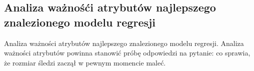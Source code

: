 \documentclass[]{article}
\begin{document}
\hypertarget{analiza-waux17cnoux15bux107i-atrybutuxf3w-najlepszego-znalezionego-modelu-regresji}{%
\subsection{Analiza ważnośći atrybutów najlepszego znalezionego modelu
regresji
}\label{analiza-waux17cnoux15bux107i-atrybutuxf3w-najlepszego-znalezionego-modelu-regresji}}

Analiza ważności atrybutów najlepszego znalezionego modelu regresji.
Analiza ważności atrybutów powinna stanowić próbę odpowiedzi na pytanie:
co sprawia, że rozmiar śledzi zaczął w pewnym momencie maleć.
\end{document}
